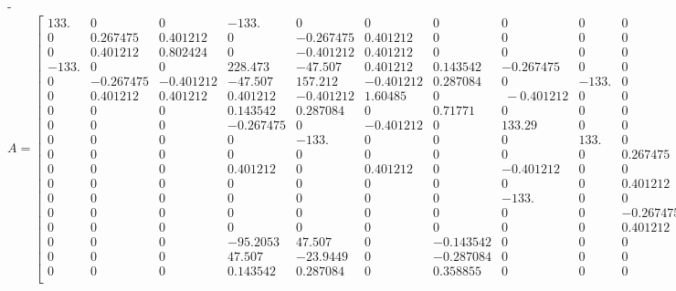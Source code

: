 \begin{adjustwidth}{}{-\marginparwidth}\small
\[A = \begin{bmatrix}
 133. & 0 & 0 & -133. & 0 & 0 & 0 & 0 & 0 & 0 & 0 & 0 & 0 & 0 & 0 & 0 \
& 0 & 0 \\
 0 & 0.267475 & 0.401212 & 0 & -0.267475 & 0.401212 & 0 & 0 & 0 & 0 & \
0 & 0 & 0 & 0 & 0 & 0 & 0 & 0 \\
 0 & 0.401212 & 0.802424 & 0 & -0.401212 & 0.401212 & 0 & 0 & 0 & 0 & \
0 & 0 & 0 & 0 & 0 & 0 & 0 & 0 \\
 -133. & 0 & 0 & 228.473 & -47.507 & 0.401212 & 0.143542 & -0.267475 \
& 0 & 0 & 0.401212 & 0 & 0 & 0 & 0 & -95.2053 & 47.507 & 0.143542 \\
 0 & -0.267475 & -0.401212 & -47.507 & 157.212 & -0.401212 & 0.287084 \
& 0 & -133. & 0 & 0 & 0 & 0 & 0 & 0 & 47.507 & -23.9449 & 0.287084 \\
 0 & 0.401212 & 0.401212 & 0.401212 & -0.401212 & 1.60485 & 0 & \
-0.401212 & 0 & 0 & 0.401212 & 0 & 0 & 0 & 0 & 0 & 0 & 0 \\
 0 & 0 & 0 & 0.143542 & 0.287084 & 0 & 0.71771 & 0 & 0 & 0 & 0 & 0 & \
0 & 0 & 0 & -0.143542 & -0.287084 & 0.358855 \\
 0 & 0 & 0 & -0.267475 & 0 & -0.401212 & 0 & 133.29 & 0 & 0 & \
-0.401212 & 0 & -133. & 0 & 0 & 0 & 0 & 0 \\
 0 & 0 & 0 & 0 & -133. & 0 & 0 & 0 & 133. & 0 & 0 & 0 & 0 & 0 & 0 & 0 \
& 0 & 0 \\
 0 & 0 & 0 & 0 & 0 & 0 & 0 & 0 & 0 & 0.267475 & 0 & 0.401212 & 0 & \
-0.267475 & 0.401212 & 0 & 0 & 0 \\
 0 & 0 & 0 & 0.401212 & 0 & 0.401212 & 0 & -0.401212 & 0 & 0 & \
0.802424 & 0 & 0 & 0 & 0 & 0 & 0 & 0 \\
 0 & 0 & 0 & 0 & 0 & 0 & 0 & 0 & 0 & 0.401212 & 0 & 0.802424 & 0 & \
-0.401212 & 0.401212 & 0 & 0 & 0 \\
 0 & 0 & 0 & 0 & 0 & 0 & 0 & -133. & 0 & 0 & 0 & 0 & 135.14 & 0 & \
-1.60485 & -2.1398 & 0 & -1.60485 \\
 0 & 0 & 0 & 0 & 0 & 0 & 0 & 0 & 0 & -0.267475 & 0 & -0.401212 & 0 & \
266.267 & -0.401212 & 0 & -266. & 0 \\
 0 & 0 & 0 & 0 & 0 & 0 & 0 & 0 & 0 & 0.401212 & 0 & 0.401212 & \
-1.60485 & -0.401212 & 2.40727 & 1.60485 & 0 & 0.802424 \\
 0 & 0 & 0 & -95.2053 & 47.507 & 0 & -0.143542 & 0 & 0 & 0 & 0 & 0 & \
-2.1398 & 0 & 1.60485 & 97.3451 & -47.507 & 1.46131 \\
 0 & 0 & 0 & 47.507 & -23.9449 & 0 & -0.287084 & 0 & 0 & 0 & 0 & 0 & \
0 & -266. & 0 & -47.507 & 289.945 & -0.287084 \\
 0 & 0 & 0 & 0.143542 & 0.287084 & 0 & 0.358855 & 0 & 0 & 0 & 0 & 0 & \
-1.60485 & 0 & 0.802424 & 1.46131 & -0.287084 & 2.32256 \\
\end{bmatrix}\]
\end{adjustwidth}
